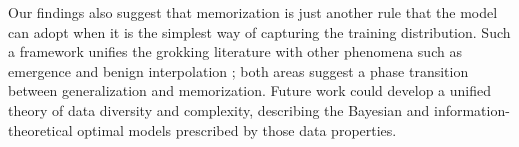Our findings also suggest that memorization is just another rule that the model can adopt when it is the simplest way of capturing the training distribution. Such a framework unifies the grokking literature with other phenomena such as emergence \citep{Schaeffer2023-od} and benign interpolation \citep{Theunissen2020-pv}; both areas suggest a phase transition between generalization and memorization. Future work could develop a unified theory of data diversity and complexity, describing the Bayesian and information-theoretical optimal models prescribed by those data properties.



